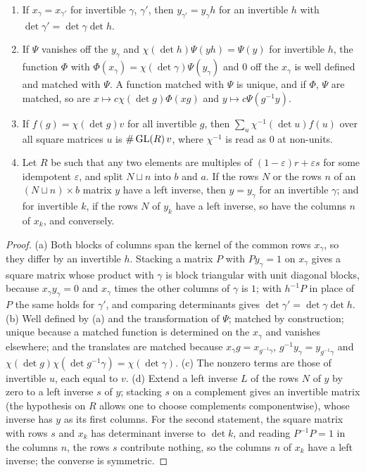 \begin{lemma}\label{lem:finite-matching}
\begin{enumerate}[label=\textup{(\alph*)}]
\item If $x_\gamma=x_{\gamma'}$ for invertible $\gamma$, $\gamma'$, then $y_{\gamma'}=y_\gamma h$ for an invertible $h$ with $\det\gamma'=\det\gamma\det h$.
\item If $\Psi$ vanishes off the $y_\gamma$ and $\chi(\det h)\Psi(yh)=\Psi(y)$ for invertible $h$, the function $\Phi$ with $\Phi(x_\gamma)=\chi(\det\gamma)\Psi(y_\gamma)$ and $0$ off the $x_\gamma$ is well defined and
matched with $\Psi$. A function matched with $\Psi$ is unique, and if $\Phi$, $\Psi$ are matched, so are $x\mapsto c\chi(\det g)\Phi(xg)$ and $y\mapsto c\Psi(g^{-1}y)$.
\item If $f(g)=\chi(\det g)v$ for all invertible $g$, then $\sum_u\chi^{-1}(\det u)f(u)$ over all square matrices $u$ is $\#\operatorname{GL}(R)\,v$, where $\chi^{-1}$ is read as $0$ at non-units.
\item Let $R$ be such that any two elements are multiples of $(1-\varepsilon)r+\varepsilon s$ for some idempotent $\varepsilon$, and split $N\sqcup n$ into $b$ and $a$. If the rows $N$ or the rows $n$ of an
$(N\sqcup n)\times b$ matrix $y$ have a left inverse, then $y=y_\gamma$ for an invertible $\gamma$; and for invertible $k$, if the rows $N$ of $y_k$ have a left inverse, so have the columns $n$ of $x_k$, and
conversely.
\end{enumerate}
\end{lemma}

\begin{proof}
(a) Both blocks of columns span the kernel of the common rows $x_\gamma$, so they differ by an invertible $h$. Stacking a matrix $P$ with $Py_\gamma=1$ on $x_\gamma$ gives a square matrix whose product with $\gamma$ is
block triangular with unit diagonal blocks, because $x_\gamma y_\gamma=0$ and $x_\gamma$ times the other columns of $\gamma$ is $1$; with $h^{-1}P$ in place of $P$ the same holds for $\gamma'$, and comparing
determinants gives $\det\gamma'=\det\gamma\det h$. (b) Well defined by (a) and the transformation of $\Psi$; matched by construction; unique because a matched function is determined on the $x_\gamma$ and vanishes
elsewhere; and the translates are matched because $x_\gamma g=x_{g^{-1}\gamma}$, $g^{-1}y_\gamma=y_{g^{-1}\gamma}$ and $\chi(\det g)\chi(\det g^{-1}\gamma)=\chi(\det\gamma)$. (c) The nonzero terms are those of invertible $u$,
each equal to $v$. (d) Extend a left inverse $L$ of the rows $N$ of $y$ by zero to a left inverse $s$ of $y$; stacking $s$ on a complement gives an invertible matrix (the hypothesis on $R$ allows one to choose
complements componentwise), whose inverse has $y$ as its first columns. For the second statement, the square matrix with rows $s$ and $x_k$ has determinant inverse to $\det k$, and reading $P^{-1}P=1$ in the
columns $n$, the rows $s$ contribute nothing, so the columns $n$ of $x_k$ have a left inverse; the converse is symmetric.
\end{proof}

